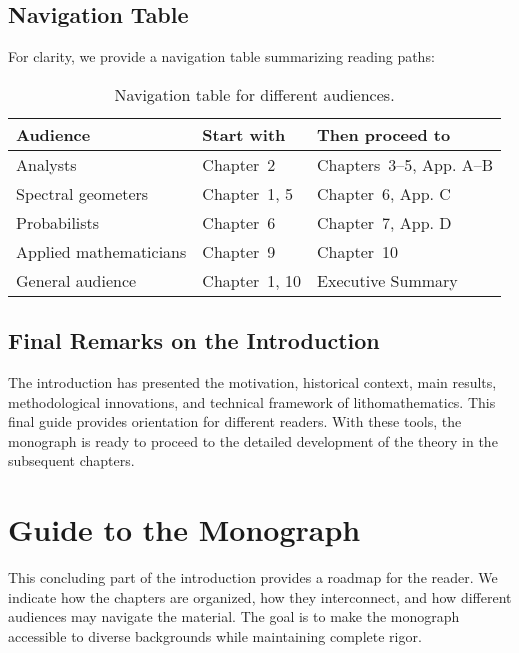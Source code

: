 \subsection{Navigation Table}

For clarity, we provide a navigation table summarizing reading paths:

\begin{table}[h]
\centering
\begin{tabular}{|l|l|l|}
\hline
\textbf{Audience} & \textbf{Start with} & \textbf{Then proceed to} \\
\hline
Analysts & Chapter~2 & Chapters~3–5, App. A–B \\
Spectral geometers & Chapter~1, 5 & Chapter~6, App. C \\
Probabilists & Chapter~6 & Chapter~7, App. D \\
Applied mathematicians & Chapter~9 & Chapter~10 \\
General audience & Chapter~1, 10 & Executive Summary \\
\hline
\end{tabular}
\caption{Navigation table for different audiences.}
\end{table}

\subsection{Final Remarks on the Introduction}

The introduction has presented the motivation, historical context, main results,
methodological innovations, and technical framework of lithomathematics. This
final guide provides orientation for different readers. With these tools, the
monograph is ready to proceed to the detailed development of the theory in the
subsequent chapters.


\section{Guide to the Monograph}

This concluding part of the introduction provides a roadmap for the reader.
We indicate how the chapters are organized, how they interconnect, and how
different audiences may navigate the material. The goal is to make the
monograph accessible to diverse backgrounds while maintaining complete rigor.

